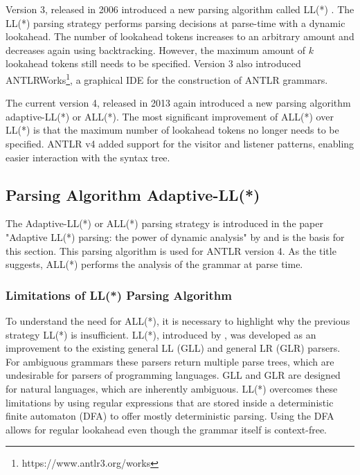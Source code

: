 Version 3, released in 2006 introduced a new parsing algorithm called LL(*) \parencite{LLSParsing2011}. The LL(*) parsing strategy performs parsing decisions at parse-time with a dynamic lookahead. The number of lookahead tokens increases to an arbitrary amount and decreases again using backtracking. However, the maximum amount of $k$ lookahead tokens still needs to be specified. Version 3 also introduced ANTLRWorks\footnote{https://www.antlr3.org/works}, a graphical IDE for the construction of ANTLR grammars.

The current version 4, released in 2013 again introduced a new parsing algorithm adaptive-LL(*) or ALL(*). The most significant improvement of ALL(*) over LL(*) is that the maximum number of lookahead tokens no longer needs to be specified. ANTLR v4 added support for the visitor and listener patterns, enabling easier interaction with the syntax tree. 

\subsection{Parsing Algorithm Adaptive-LL(*)}
\label{sec:allstar}

The Adaptive-LL(*) or ALL(*) parsing strategy is introduced in the paper "Adaptive LL(*) parsing: the power of dynamic analysis" by \textcite{ALLParsing2014} and is the basis for this section. This parsing algorithm is used  for ANTLR version 4. As the title suggests, ALL(*) performs the analysis of the grammar at parse time. 

\subsubsection{Limitations of LL(*) Parsing Algorithm}

To understand the need for ALL(*), it is necessary to highlight why the previous strategy LL(*) is insufficient. LL(*), introduced by \textcite{parr2011ll}, was developed as an improvement to the existing general LL (GLL) \parencite{GLL2010} and general LR (GLR) \parencite{tomita1991generalized} parsers. For ambiguous grammars these parsers return multiple parse trees, which are undesirable for parsers of programming languages. GLL and GLR are  designed for natural languages, which are inherently ambiguous. LL(*) overcomes these limitations by using regular expressions that are stored inside a deterministic finite automaton (DFA) to offer mostly deterministic parsing. Using the DFA allows for regular lookahead even though the grammar itself is context-free. 

